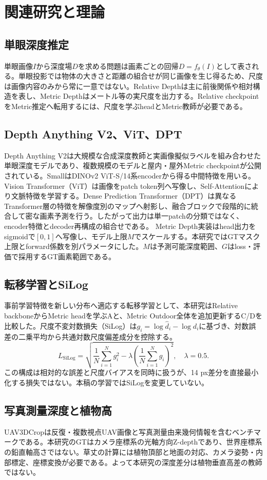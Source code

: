 \chapter{関連研究と理論}
\section{単眼深度推定}
単眼画像$I$から深度場$D$を求める問題は画素ごとの回帰$D=f_\theta(I)$として表される。単眼投影では物体の大きさと距離の組合せが同じ画像を生じ得るため、尺度は画像内容のみから常に一意ではない。Relative Depthは主に前後関係や相対構造を表し、Metric Depthはメートル等の実尺度を出力する。Relative checkpointをMetric推定へ転用するには、尺度を学ぶheadとMetric教師が必要である。
\section{Depth Anything V2、ViT、DPT}
Depth Anything V2は大規模な合成深度教師と実画像擬似ラベルを組み合わせた単眼深度モデルであり、複数規模のモデルと屋内・屋外Metric checkpointが公開されている\cite{dav2}。SmallはDINOv2 ViT-S/14系encoderから得る中間特徴を用いる\cite{dinov2}。Vision Transformer（ViT）は画像をpatch token列へ写像し、Self-Attentionにより文脈特徴を学習する\cite{vit2021}。Dense Prediction Transformer（DPT）は異なるTransformer層の特徴を解像度別のマップへ射影し、融合ブロックで段階的に統合して密な画素予測を行う\cite{dpt2021}。したがって出力は単一patchの分類ではなく、encoder特徴とdecoder再構成の組合せである。
Metric Depth実装はhead出力をsigmoidで$[0,1]$へ写像し、モデル上限$M$でスケールする。本研究ではGTマスク上限とforward係数を別パラメータにした。$M$は予測可能深度範囲、$G$はloss・評価で採用するGT画素範囲である。
\section{転移学習とSiLog}
事前学習特徴を新しい分布へ適応する転移学習として、本研究はRelative backboneからMetric headを学ぶAと、Metric Outdoor全体を追加更新するC/Dを比較した。尺度不変対数損失（SiLog）は$g_i=\log\hat d_i-\log d_i$に基づき、対数誤差の二乗平均から共通対数尺度偏差成分を控除する\cite{eigen2014}。
\[
L_{\mathrm{SiLog}}=\sqrt{\frac1N\sum_{i=1}^N g_i^2-\lambda\left(\frac1N\sum_{i=1}^N g_i\right)^2},\quad \lambda=0.5.
\]
この構成は相対的な誤差と尺度バイアスを同時に扱うが、14 px差分を直接最小化する損失ではない。本稿の学習ではSiLogを変更していない。
\section{写真測量深度と植物高}
UAV3DCropは反復・複数視点UAV画像と写真測量由来幾何情報を含むベンチマークである\cite{uav3dcrop}。本研究のGTはカメラ座標系の光軸方向Z-depthであり、世界座標系の鉛直軸高さではない。草丈の計算には植物頂部と地面の対応、カメラ姿勢・内部標定、座標変換が必要である。よって本研究の深度差分は植物垂直高差の教師ではない。